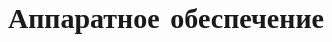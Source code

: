 \documentclass[document.tex]{subfiles}
\begin{document}
\section{Аппаратное обеспечение}
\end{document}

